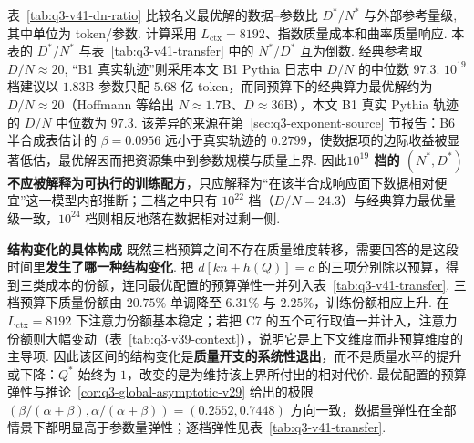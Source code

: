 表~\ref{tab:q3-v41-dn-ratio} 比较名义最优解的数据–参数比 $D^*/N^*$ 与外部参考量级, 其中单位为 token/参数. 计算采用 $L_{\mathrm{ctx}}=8192$、指数质量成本和曲率质量响应. 本表的 $D^*/N^*$ 与表~\ref{tab:q3-v41-transfer} 中的 $N^*/D^*$ 互为倒数. 经典参考取 $D/N\approx20$, “B1 真实轨迹”则采用本文 B1 Pythia 日志中 $D/N$ 的中位数 $97.3$.
$10^{19}$ 档建议以 $1.83$B 参数只配 $5.68$ 亿 token，而同预算下的经典算力最优解约为 $D/N\approx20$（Hoffmann 等给出 $N\approx1.7$B、$D\approx36$B），本文 B1 真实 Pythia 轨迹的 $D/N$ 中位数为 $97.3$. 该差异的来源在第~\ref{sec:q3-exponent-source} 节报告：B6 半合成表估计的 $\beta=0.0956$ 远小于真实轨迹的 $0.2799$，使数据项的边际收益被显著低估，最优解因而把资源集中到参数规模与质量上界. 因此\textbf{$10^{19}$ 档的 $(N^*,D^*)$ 不应被解释为可执行的训练配方}，只应解释为“在该半合成响应面下数据相对便宜”这一模型内部推断；三档之中只有 $10^{22}$ 档（$D/N=24.3$）与经典算力最优量级一致，$10^{24}$ 档则相反地落在数据相对过剩一侧. 

\textbf{结构变化的具体构成} 既然三档预算之间不存在质量维度转移，需要回答的是这段时间里\textbf{发生了哪一种结构变化}. 把 $d[kn+h(Q)]=c$ 的三项分别除以预算，得到三类成本的份额，连同最优配置的预算弹性一并列入表~\ref{tab:q3-v41-transfer}. 三档预算下质量份额由 $20.75\%$ 单调降至 $6.31\%$ 与 $2.25\%$，训练份额相应上升. 在 $L_{\mathrm{ctx}}=8192$ 下注意力份额基本稳定；若把 C7 的五个可行取值一并计入，注意力份额则大幅变动（表~\ref{tab:q3-v39-context}），说明它是上下文维度而非预算维度的主导项. 因此该区间的结构变化是\textbf{质量开支的系统性退出}，而不是质量水平的提升或下降：$Q^*$ 始终为 $1$，改变的是为维持该上界所付出的相对代价. 最优配置的预算弹性与推论~\ref{cor:q3-global-asymptotic-v29} 给出的极限 $(\beta/(\alpha+\beta),\alpha/(\alpha+\beta))=(0.2552,0.7448)$ 方向一致，数据量弹性在全部情景下都明显高于参数量弹性；逐档弹性见表~\ref{tab:q3-v41-transfer}. 

